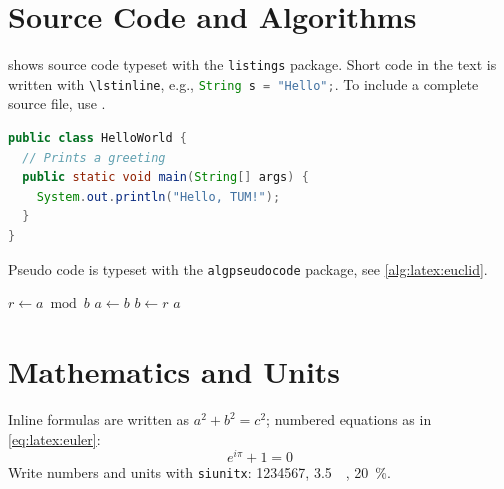 \section{Source Code and Algorithms}\label{sec:latex:code}

 shows source code typeset with the \texttt{listings} package.
Short code in the text is written with \verb|\lstinline|, e.g., \lstinline[language=Java]|String s = "Hello";|.
To include a complete source file, use \verb||.

\begin{lstlisting}[language=Java, caption={A Java example}, label={lst:latex:java}, float=htbp]
public class HelloWorld {
  // Prints a greeting
  public static void main(String[] args) {
    System.out.println("Hello, TUM!");
  }
}
\end{lstlisting}

Pseudo code is typeset with the \texttt{algpseudocode} package, see \cref{alg:latex:euclid}.

\begin{algorithm}[htbp]
  \caption{Euclid's algorithm}\label{alg:latex:euclid}
  \begin{algorithmic}[1]
        \State $r \gets a \bmod b$
        \State $a \gets b$
        \State $b \gets r$ 
      \EndWhile
      \State \Return $a$
    \EndProcedure
  \end{algorithmic}
\end{algorithm}

\section{Mathematics and Units}\label{sec:latex:math}

Inline formulas are written as $a^2 + b^2 = c^2$; numbered equations as in \cref{eq:latex:euler}:
\begin{equation}
  e^{i\pi} + 1 = 0 \label{eq:latex:euler}
\end{equation}
Write numbers and units with \texttt{siunitx}: \num{1234567}, \qty{3.5}{\giga\byte}, \qty{20}{\percent}.

